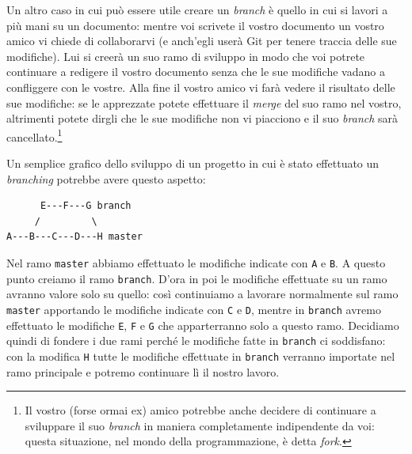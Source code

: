 \documentclass[a4paper,12pt,oneside]{article}
\begin{document}
Un altro caso in cui può essere utile creare un \emph{branch} è quello in cui si
lavori a più mani su un documento: mentre voi scrivete il vostro documento un
vostro amico vi chiede di collaborarvi (e anch'egli userà Git per tenere traccia
delle sue modifiche). Lui si creerà un suo ramo di sviluppo in modo che voi
potrete continuare a redigere il vostro documento senza che le sue modifiche
vadano a confliggere con le vostre. Alla fine il vostro amico vi farà vedere il
risultato delle sue modifiche: se le apprezzate potete effettuare il \emph{merge}
del suo ramo nel vostro, altrimenti potete dirgli che le sue modifiche non vi
piacciono e il suo \emph{branch} sarà cancellato.\footnote{Il vostro (forse ormai
  ex) amico potrebbe anche decidere di continuare a sviluppare il suo
  \emph{branch} in maniera completamente indipendente da voi: questa situazione,
  nel mondo della programmazione, è detta \emph{fork}.}

Un semplice grafico dello sviluppo di un progetto in cui è stato effettuato un
\emph{branching} potrebbe avere questo aspetto:
\begin{lstlisting}
      E---F---G branch
     /         \
A---B---C---D---H master
\end{lstlisting}
Nel ramo \lstinline|master| abbiamo effettuato le modifiche indicate con
\lstinline|A| e \lstinline|B|. A questo punto creiamo il ramo
\lstinline|branch|. D'ora in poi le modifiche effettuate su un ramo avranno
valore solo su quello: così continuiamo a lavorare normalmente sul ramo
\lstinline|master| apportando le modifiche indicate con \lstinline|C| e
\lstinline|D|, mentre in \lstinline|branch| avremo effettuato le modifiche
\lstinline|E|, \lstinline|F| e \lstinline|G| che apparterranno solo a questo ramo.
Decidiamo quindi di fondere i due rami perché le modifiche fatte in
\lstinline|branch| ci soddisfano: con la modifica \lstinline|H| tutte le modifiche
effettuate in \lstinline|branch| verranno importate nel ramo principale e potremo
continuare lì il nostro lavoro.
\end{document}
